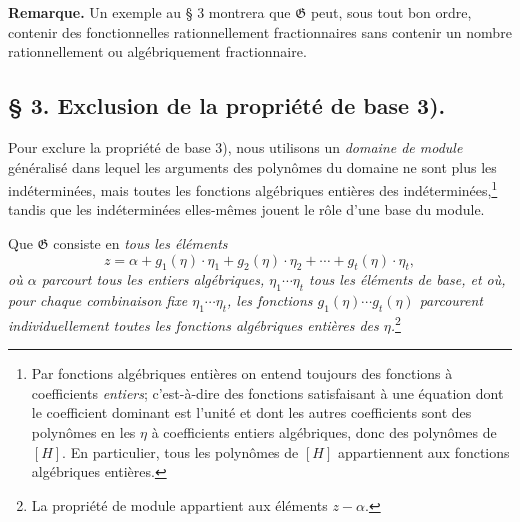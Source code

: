 \textbf{Remarque.} Un exemple au \S{} 3 montrera que $\mathfrak G$ peut, sous tout bon ordre, contenir des fonctionnelles rationnellement fractionnaires sans contenir un nombre rationnellement ou algébriquement fractionnaire.

\subsection*{\S{} 3. Exclusion de la propriété de base 3).}

Pour exclure la propriété de base 3), nous utilisons un \emph{domaine de module} généralisé dans lequel les arguments des polynômes du domaine ne sont plus les indéterminées, mais toutes les fonctions algébriques entières des indéterminées,\footnote{Par \og{} fonctions algébriques entières \fg{} on entend toujours des fonctions à coefficients \emph{entiers}; c'est-à-dire des fonctions satisfaisant à une équation dont le coefficient dominant est l'unité et dont les autres coefficients sont des polynômes en les $\eta$ à coefficients entiers algébriques, donc des polynômes de $[H]$. En particulier, tous les polynômes de $[H]$ appartiennent aux fonctions algébriques entières.} tandis que les indéterminées elles-mêmes jouent le rôle d'une base du module.

Que $\mathfrak G$ consiste en \emph{tous les éléments}
\begin{equation}
 z=\alpha+g_1(\eta)\cdot\eta_1+g_2(\eta)\cdot\eta_2+\cdots+g_t(\eta)\cdot\eta_t,
\tag{1}
\end{equation}
\emph{où $\alpha$ parcourt tous les entiers algébriques, $\eta_1\cdots\eta_t$ tous les éléments de base, et où, pour chaque combinaison fixe $\eta_1\cdots\eta_t$, les fonctions $g_1(\eta)\cdots g_t(\eta)$ parcourent individuellement toutes les fonctions algébriques entières des $\eta$.}\footnote{La propriété de module appartient aux éléments $z-\alpha$.}

